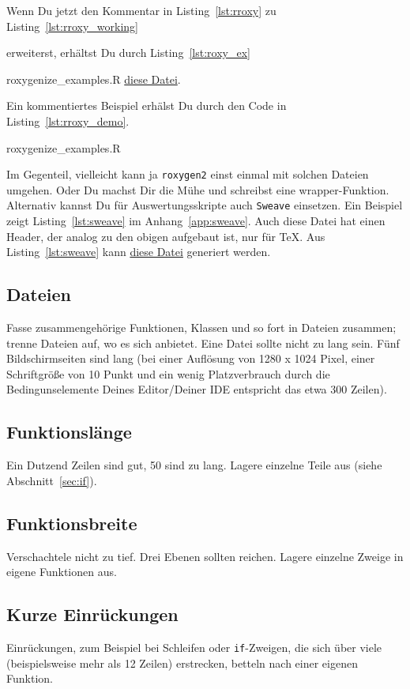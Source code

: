 \documentclass[twoside]{scrartcl}
\providecommand{\code}[1]{\texttt{#1}}
\begin{document}
Wenn Du jetzt den Kommentar in  Listing~\ref{lst:rroxy} zu
Listing~\ref{lst:rroxy_working} 

erweiterst, erh\"altst Du durch
Listing~\ref{lst:roxy_ex} 

{roxygenize_examples.R}
\href{r_roxygen.pdf}{diese Datei}.  

Ein kommentiertes Beispiel erh\"a{}lst Du
durch den Code in Listing~\ref{lst:rroxy_demo}. 

{roxygenize_examples.R}

\else 
Im Gegenteil, vielleicht kann ja \code{roxygen2} einst einmal mit solchen
Dateien umgehen. Oder Du machst Dir die M\"u{}he und schreibst eine
wrapper-Funktion.
\fi
{} Alternativ kannst Du f\"u{}r Auswertungsskripte auch
\code{Sweave} einsetzen. Ein Beispiel zeigt Listing~\ref{lst:sweave} im
Anhang~\ref{app:sweave}.
Auch diese Datei hat einen Header, der analog zu den obigen aufgebaut ist, nur
f\"u{}r \TeX{}.
Aus  Listing~\ref{lst:sweave} kann \href{template.pdf}{diese Datei} generiert
werden. 
\subsection{Dateien} Fasse zusammengeh\"o{}rige Funktionen, Klassen und
so fort in Dateien zusammen; trenne Dateien auf, wo es sich anbietet.
Eine Datei sollte nicht zu lang sein. F\"u{}nf Bildschirmseiten sind
lang (bei einer Aufl\"o{}sung von 1280 x 1024 Pixel, einer
Schriftgr\"o{}\ss{}e von 10 Punkt und ein wenig Platzverbrauch durch die
Bedingunselemente Deines Editor/Deiner IDE entspricht das etwa 300
Zeilen).

\subsection{Funktionsl\"a{}nge} Ein Dutzend Zeilen sind gut, 50 sind zu lang.
Lagere einzelne Teile aus (siehe Abschnitt~\ref{sec:if}).

\subsection{Funktionsbreite\label{sec:breite}} Verschachtele nicht zu tief. Drei
Ebenen sollten reichen. Lagere einzelne Zweige in eigene Funktionen aus.

\subsection{Kurze Einr\"u{}ckungen} Einr\"u{}ckungen, zum Beispiel bei Schleifen
oder \code{if}-Zweigen,
die sich \"u{}ber viele (beispielsweise mehr als 12 Zeilen) erstrecken, betteln
nach einer eigenen Funktion.
\end{document}
